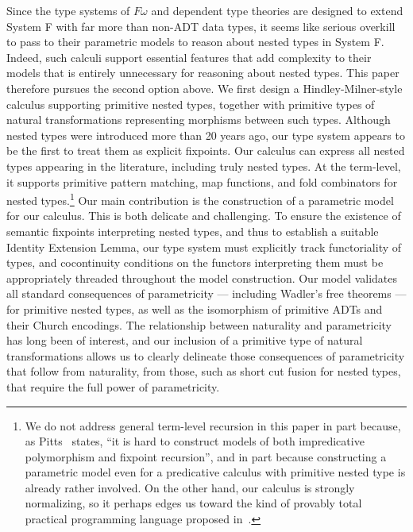 \documentclass[runningheads]{llncs}
\begin{document}
Since the type systems of $F\omega$ and dependent type theories are
designed to extend System F with far more than non-ADT data types, it
seems like serious overkill to pass to their parametric models to
reason about nested types in System F. Indeed, such calculi support
essential features that add complexity to their models that is
entirely unnecessary for reasoning about nested types. This paper
therefore pursues the second option above.  We first design a
Hindley-Milner-style calculus supporting primitive nested types,
together with primitive types of natural transformations representing
morphisms between such types.  Although nested types were introduced
more than 20 years ago, our type system appears to be the first to
treat them as explicit fixpoints. Our calculus can express all nested
types appearing in the literature, including truly nested types.  At
the term-level, it supports primitive pattern matching, map functions,
and fold combinators for nested types.\footnote{We do not address
  general term-level recursion in this paper in part because, as
  Pitts~\cite{pit00} states, ``it is hard to construct models of both
  impredicative polymorphism and fixpoint recursion'', and in part
  because constructing a parametric model even for a predicative
  calculus with primitive nested type is already rather involved.
  On the other hand, our calculus is strongly normalizing, so it
  perhaps edges us toward the kind of provably total practical
  programming language proposed in~\cite{wad89}.}  Our main
contribution is the construction of a parametric model for our
calculus. This is both delicate and challenging. To ensure the
existence of semantic fixpoints interpreting nested types, and thus to
establish a suitable Identity Extension Lemma, our type system must
explicitly track functoriality of types, and cocontinuity conditions
on the functors interpreting them must be appropriately threaded
throughout the model construction. Our model validates all standard
consequences of parametricity --- including Wadler's free theorems ---
for primitive nested types, as well as the isomorphism of primitive
ADTs and their Church encodings. The relationship between naturality
and parametricity has long been of interest, and our inclusion of a
primitive type of natural transformations allows us to clearly
delineate those consequences of parametricity
that follow from naturality,
from those, such as short cut fusion for nested types, that
require the full power of parametricity.
\end{document}
